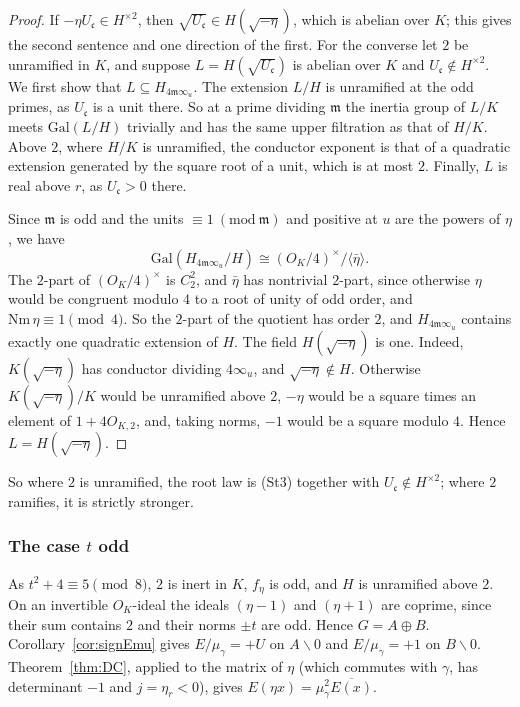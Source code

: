 \documentclass[11pt]{amsart}
\numberwithin{equation}{section}
\theoremstyle{plain}
\theoremstyle{definition}
\theoremstyle{remark}
\begin{document}
\begin{proof}
If \(-\eta U_{\mathfrak c}\in H^{\times2}\), then \(\sqrt{U_{\mathfrak c}}\in H(\sqrt{-\eta})\), which is abelian over \(K\); this gives the second sentence and one direction of the first. For the converse let \(2\) be unramified in \(K\), and suppose \(L=H(\sqrt{U_{\mathfrak c}})\) is abelian over \(K\) and \(U_{\mathfrak c}\notin H^{\times2}\). We first show that \(L\subseteq H_{4\mathfrak m\infty_u}\). The extension \(L/H\) is unramified at the odd primes, as \(U_{\mathfrak c}\) is a unit there. So at a prime dividing \(\mathfrak m\) the inertia group of \(L/K\) meets \(\mathrm{Gal}(L/H)\) trivially and has the same upper filtration as that of \(H/K\). Above \(2\), where \(H/K\) is unramified, the conductor exponent is that of a quadratic extension generated by the square root of a unit, which is at most \(2\). Finally, \(L\) is real above \(r\), as \(U_{\mathfrak c}>0\) there.

Since \(\mathfrak m\) is odd and the units \(\equiv1\ (\mathrm{mod}\ \mathfrak m)\) and positive at \(u\) are the powers of \(\eta\), we have
\[\mathrm{Gal}(H_{4\mathfrak m\infty_u}/H)\cong(O_K/4)^\times/\langle\bar\eta\rangle.\]
The \(2\)-part of \((O_K/4)^\times\) is \(C_2^2\), and \(\bar\eta\) has nontrivial \(2\)-part, since otherwise \(\eta\) would be congruent modulo \(4\) to a root of unity of odd order, and \(\mathrm{Nm}\,\eta\equiv1\pmod4\). So the \(2\)-part of the quotient has order \(2\), and \(H_{4\mathfrak m\infty_u}\) contains exactly one quadratic extension of \(H\). The field \(H(\sqrt{-\eta})\) is one. Indeed, \(K(\sqrt{-\eta})\) has conductor dividing \(4\infty_u\), and \(\sqrt{-\eta}\notin H\). Otherwise \(K(\sqrt{-\eta})/K\) would be unramified above \(2\), \(-\eta\) would be a square times an element of \(1+4O_{K,2}\), and, taking norms, \(-1\) would be a square modulo \(4\). Hence \(L=H(\sqrt{-\eta})\).
\end{proof}

So where \(2\) is unramified, the root law is (St3) together with \(U_{\mathfrak c}\notin H^{\times2}\); where \(2\) ramifies, it is strictly stronger.

\subsubsection*{The case \(t\) odd}

As \(t^2+4\equiv5\pmod8\), \(2\) is inert in \(K\), \(f_\eta\) is odd, and \(H\) is unramified above \(2\). On an invertible \(O_K\)-ideal the ideals \((\eta-1)\) and \((\eta+1)\) are coprime, since their sum contains \(2\) and their norms \(\pm t\) are odd. Hence \(G=A\oplus B\). Corollary~\ref{cor:signEmu} gives \(E/\mu_\gamma=+U\) on \(A\smallsetminus0\) and \(E/\mu_\gamma=+1\) on \(B\smallsetminus0\). Theorem~\ref{thm:DC}, applied to the matrix of \(\eta\) (which commutes with \(\gamma\), has determinant \(-1\) and \(j=\eta_r<0\)), gives \(E(\eta x)=\mu_\gamma^2\overline{E(x)}\).
\end{document}
